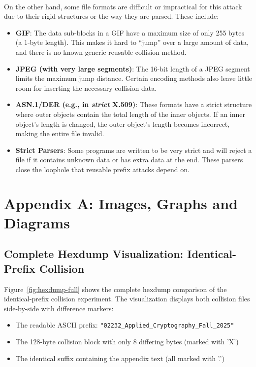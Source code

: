 \documentclass[runningheads]{llncs}
\begin{document}
    \paragraph{}
    On the other hand, some file formats are difficult or impractical for this attack due to their rigid structures or the way they are parsed. These include:
    \begin{itemize}
        \item \textbf{GIF}: The data sub-blocks in a GIF have a maximum size of only 255 bytes (a 1-byte length). This makes it hard to “jump” over a large amount of data, and there is no known generic reusable collision method.
        \item \textbf{JPEG (with very large segments)}: The 16-bit length of a JPEG segment limits the maximum jump distance. Certain encoding methods also leave little room for inserting the necessary collision data.
        \item \textbf{ASN.1/DER (e.g., in \textit{strict} X.509)}: These formats have a strict structure where outer objects contain the total length of the inner objects. If an inner object's length is changed, the outer object's length becomes incorrect, making the entire file invalid.
        \item \textbf{Strict Parsers}: Some programs are written to be very strict and will reject a file if it contains unknown data or has extra data at the end. These parsers close the loophole that reusable prefix attacks depend on.
    \end{itemize}

    \newpage
    \section{Appendix A: Images, Graphs and Diagrams}

    \subsection{Complete Hexdump Visualization: Identical-Prefix Collision}

    Figure~\ref{fig:hexdump-full} shows the complete hexdump comparison of the identical-prefix collision experiment. The visualization displays both collision files side-by-side with difference markers:
    \begin{itemize}
        \item The readable ASCII prefix: \texttt{"02232\_Applied\_Cryptography\_Fall\_2025"}
        \item The 128-byte collision block with only 8 differing bytes (marked with 'X')
        \item The identical suffix containing the appendix text (all marked with '.')
    \end{itemize}
\end{document}
